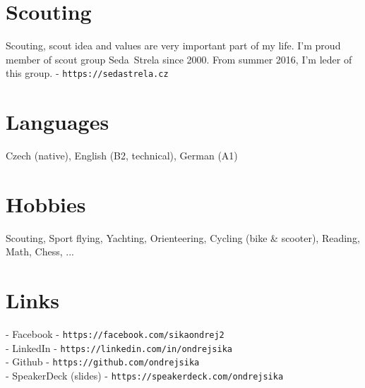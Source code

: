 \documentclass[12pt,a4paper]{article}
\begin{document}
\section*{Scouting}

Scouting, scout idea and values are very important part of my life. I'm proud member of scout group Seda~Strela since 2000. From summer 2016, I'm leder of this group. - \texttt{https://sedastrela.cz}


\section*{Languages}
Czech (native), English (B2, technical), German (A1)\\

\section*{Hobbies}
Scouting, Sport flying, Yachting, Orienteering, Cycling (bike \& scooter), Reading, Math, Chess, ...
\\

\section*{Links}

- Facebook - \texttt{https://facebook.com/sikaondrej2}\\
- LinkedIn - \texttt{https://linkedin.com/in/ondrejsika}\\
- Github - \texttt{https://github.com/ondrejsika}\\
- SpeakerDeck (slides) - \texttt{https://speakerdeck.com/ondrejsika}\\
\end{document}
